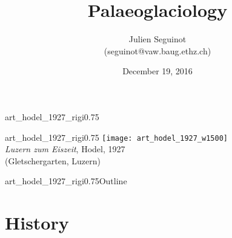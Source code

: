 

\title{Palaeoglaciology}
\author{Julien Seguinot\\\small{(seguinot@vaw.baug.ethz.ch)}}
\date{December 19, 2016}

\usepackage{multicol}




    \centering  %

    \begin{backgroundframe}{art_hodel_1927_rigi}{0.75}{}
      \maketitle
    \end{backgroundframe}

    \begin{backgroundframe}{art_hodel_1927_rigi}{0.75}{}
      \texttt{[image: art\_hodel\_1927\_w1500]}\\
      \bigskip
      \emph{Luzern zum Eiszeit}, Hodel, 1927\\(Gletschergarten, Luzern)
    \end{backgroundframe}

    \begin{sectionframe}{art_hodel_1927_rigi}{0.75}{Outline}
      \begin{multicols}{2}
        \tableofcontents[pausesections]  %
      \end{multicols}
    \end{sectionframe}

\section{History}

